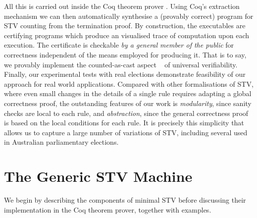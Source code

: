 \documentclass{llncs}
\begin{document}
All this is carried out inside the Coq theorem prover
\cite{Bertot:2004:ITP}.  Using Coq's extraction mechanism
\cite{Letouzey:2003:NEC} we can then automatically synthesise a
(provably correct) program for STV counting from the termination
proof.  
By construction, the executables are certifying programs which
produce an visualised trace of computation upon each execution. The
certificate is checkable \emph{by a general member of the public}
for
correctness independent of the means employed for producing it.
That is to say, we provably implement the counted-as-cast
aspect ~\cite{DBLP:journals/iacr/CortierGKMT16} of universal
verifiability. Finally, our experimental tests with real
elections demonstrate feasibility of our approach for  real world
applications. Compared with other formalisations of STV, where
even small changes in the details of a single rule requires adapting
a global correctness proof, the outstanding features of our work
is \emph{modularity}, since sanity checks are local to each
rule, and \emph{abstraction}, since the general correctness proof is based
on the local conditions for each rule. It is precisely this
simplicity that allows us to capture a large number of variations of STV,
including several used in Australian parliamentary elections.
 





\section{The Generic STV Machine}       
%

We begin by describing the components of minimal STV before
discussing their implementation in the Coq theorem prover, together
with examples. 

\end{document}
